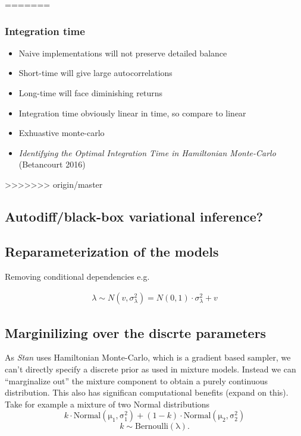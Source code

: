 \documentclass{article}
\begin{document}
=======
\subsubsection{Integration time}

\begin{itemize}
\item Naive implementations will not preserve detailed balance
\item Short-time will give large autocorrelations
\item Long-time will face diminishing returns
\item Integration time obviously linear in time, so compare to linear
\item Exhuastive monte-carlo
\item \emph{Identifying the Optimal Integration Time in Hamiltonian Monte-Carlo} (Betancourt 2016)
\end{itemize}

>>>>>>> origin/master
\subsection{Autodiff/black-box variational inference?}

\subsection{Reparameterization of the models}

Removing conditional dependencies e.g.

\begin{align*}
\lambda \sim N(v, \sigma^2_\lambda) = N(0, 1) \cdot \sigma_\lambda^2 + v
\end{align*}

\subsection{Marginilizing over the discrte parameters}

As \emph{Stan} uses Hamiltonian Monte-Carlo, which is a gradient based sampler, we can't directly specify a discrete prior as used in mixture models. Instead we can ``marginalize out'' the mixture component to obtain a purely continuous distribution. This also has significan computational benefits (expand on this). \\

Take for example a mixture of two Normal distributions
\begin{equation}
  k \cdot \operatorname{Normal(\mu_1, \sigma_1^2)} + (1 - k) \cdot \operatorname{Normal(\mu_2, \sigma_2^2)}
\end{equation} 
\begin{equation}
  k \sim \operatorname{Bernoulli(\lambda)}.
\end{equation}
\end{document}

